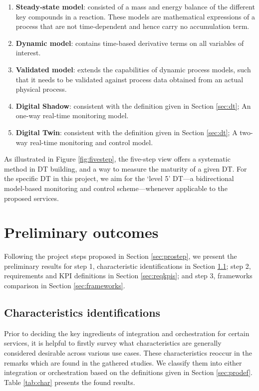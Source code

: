 \documentclass[journal,onecolumn]{IEEEtran} %
\begin{document}
\begin{enumerate}

  \item \textbf{Steady‑state model}: consisted of a mass and energy balance of the different key compounds in a reaction. These models are mathematical expressions of a process
that are not time-dependent and hence carry no accumulation
term.
  \item \textbf{Dynamic model}: contains time-based derivative terms on all variables of interest.
  \item \textbf{Validated model}: extends the capabilities of dynamic process models, such that it needs to be validated against process data obtained from an actual physical process.
  \item \textbf{Digital Shadow}: consistent with the definition given in Section \ref{sec:dt}; An one-way real-time monitoring model.
  \item \textbf{Digital Twin}: consistent with the definition given in Section \ref{sec:dt}; A two-way real-time monitoring and control model.
  
\end{enumerate}

As illustrated in Figure \ref{fig:fivestep}, the five-step view offers a systematic method in DT building, and a way to measure the maturity of a given DT. For the specific DT in this project, we aim for the `level 5' DT---a bidirectional model-based monitoring and control scheme---whenever applicable to the proposed services.

\pagebreak
\section{Preliminary outcomes}
Following the project steps proposed in Section \ref{sec:prostep}, we present the preliminary results for step 1, characteristic identifications in Section \ref{sec:char}; step 2,  requirements and KPI definitions in Section \ref{sec:reqkpis}; and step 3, frameworks comparison in Section \ref{sec:frameworks}.   

\subsection{Characteristics identifications}\label{sec:char}
Prior to deciding the key ingredients of integration and orchestration for certain services, it is helpful to firstly survey what characteristics are generally considered desirable across various use cases. These characteristics reoccur in the remarks which are found in the gathered studies. We classify them into either integration or orchestration based on the definitions given in Section \ref{sec:prodef}. Table \ref{tab:char} presents the found results.
\end{document}
